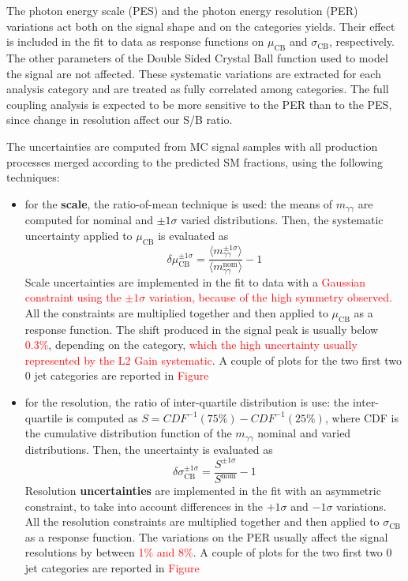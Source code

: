The photon energy scale (PES) and the photon energy resolution (PER) variations act both on the signal shape and on the categories yields. Their effect is included in the fit to data as response functions on $\mu_{\mathrm{CB}}$ and $\sigma_{\mathrm{CB}}$, respectively. The other parameters of the Double Sided Crystal Ball function used to model the signal are not affected. These systematic variations are extracted for each analysis category and are treated as fully correlated among categories. The full coupling analysis is expected to be more sensitive to the PER than to the PES, since change in resolution affect our S/B ratio.



The uncertainties are computed from MC signal samples with all production processes merged according to the predicted SM fractions, using the following techniques:
\begin{itemize}
	\item for the \textbf{scale}, the ratio-of-mean technique is used: the means of $m_{\gamma\gamma}$ are computed for nominal and $\pm1\sigma$ varied distributions. Then, the systematic uncertainty applied to $\mu_{\mathrm{CB}}$ is evaluated as
	\begin{equation}
	\delta\mu_{\mathrm{CB}}^{\pm1\sigma}=\frac{\langle m_{\gamma\gamma}^{\pm1\sigma}\rangle}{\langle m_{\gamma\gamma}^{\mathrm{nom}}\rangle}-1
	\end{equation}
	Scale uncertainties are implemented in the fit to data with a \textcolor{red}{Gaussian constraint using the $\pm1\sigma$ variation, because of the high symmetry observed.} All the constraints are multiplied together and then applied to $\mu_{\mathrm{CB}}$ as a response function. The shift produced in the signal peak is usually below \textcolor{red}{0.3\%}, depending on the category, \textcolor{red}{which the high uncertainty usually represented by the L2 Gain systematic}. A couple of plots for the two first two 0 jet categories are reported in \textcolor{red}{Figure}
	\item for the resolution, the ratio of inter-quartile distribution is use: the inter-quartile is computed as $S=CDF^{-1}(75\%)-CDF^{-1}(25\%)$, where CDF is the cumulative distribution function of the $m_{\gamma\gamma}$ nominal and varied distributions. Then, the uncertainty is evaluated as
	\begin{equation}
	\delta\sigma_{\mathrm{CB}}^{\pm1\sigma}=\frac{S^{\pm1\sigma}}{S^{\mathrm{nom}}}-1
	\end{equation}
	Resolution \textbf{uncertainties} are implemented in the fit with an asymmetric constraint, to take into account differences in the $+1\sigma$ and $-1\sigma$ variations. All the resolution constraints are multiplied
together and then applied to $\sigma_{\mathrm{CB}}$ as a response function. The variations on the PER usually affect the signal resolutions by between \textcolor{red}{1\% and 8\%}. A couple of plots for the two first two 0 jet categories are reported in \textcolor{red}{Figure}
\end{itemize}

